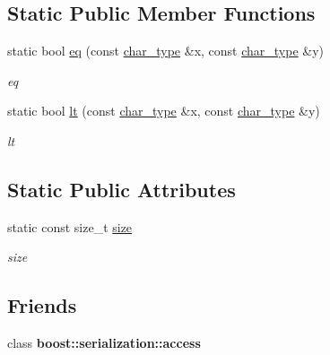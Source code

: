 \subsection*{Static Public Member Functions}
\begin{DoxyCompactItemize}
\item 
static bool \hyperlink{class_sys_transition_a500b0625bdf4376bd9e8efe5ab95a3c6}{eq} (const \hyperlink{class_net_transition_a40ad367a5a816d31e7559037c76970f0}{char\+\_\+type} \&x, const \hyperlink{class_net_transition_a40ad367a5a816d31e7559037c76970f0}{char\+\_\+type} \&y)
\begin{DoxyCompactList}\small\item\em eq \end{DoxyCompactList}\item 
static bool \hyperlink{class_sys_transition_af4a28bd6c0b91618fb8e7f78c4a7e9dc}{lt} (const \hyperlink{class_net_transition_a40ad367a5a816d31e7559037c76970f0}{char\+\_\+type} \&x, const \hyperlink{class_net_transition_a40ad367a5a816d31e7559037c76970f0}{char\+\_\+type} \&y)
\begin{DoxyCompactList}\small\item\em lt \end{DoxyCompactList}\end{DoxyCompactItemize}
\subsection*{Static Public Attributes}
\begin{DoxyCompactItemize}
\item 
static const size\+\_\+t \hyperlink{class_sys_transition_a18c0e61e238edb4d01c9cefff242cf7b}{size}\hypertarget{class_sys_transition_a18c0e61e238edb4d01c9cefff242cf7b}{}\label{class_sys_transition_a18c0e61e238edb4d01c9cefff242cf7b}

\begin{DoxyCompactList}\small\item\em size \end{DoxyCompactList}\end{DoxyCompactItemize}
\subsection*{Friends}
\begin{DoxyCompactItemize}
\item 
class {\bfseries boost\+::serialization\+::access}\hypertarget{class_sys_transition_ac98d07dd8f7b70e16ccb9a01abf56b9c}{}\label{class_sys_transition_ac98d07dd8f7b70e16ccb9a01abf56b9c}

\end{DoxyCompactItemize}
